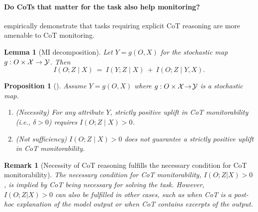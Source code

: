 \documentclass{article}
\theoremstyle{plain}
\newtheorem{proposition}[theorem]{Proposition}
\newtheorem{lemma}[theorem]{Lemma}
\newtheorem{remark}[theorem]{Remark}
\def\indep{\perp\!\!\!\perp}
\begin{document}
\paragraph{Do CoTs that matter for the task also help monitoring?}
\citet{emmons2025chainthoughtnecessarylanguage} empirically demonstrate that tasks requiring explicit CoT reasoning are more amenable to CoT monitoring.

\begin{lemma}[MI decomposition]
\label{lem:decomp}
Let $Y=g(O, X)$ for the stochastic map $g:\mathcal \mathcal O \times \mathcal X \to\mathcal Y$.
Then
\begin{equation}
\label{eq:decomp}
I(O;Z\mid X)
\ =\
I(Y;Z\mid X)\ +\ I(O;Z\mid Y,X).
\end{equation}
\end{lemma}


\begin{proposition}[]
\label{prop:IAZ-necessary-not-sufficient-clean}
Assume $Y=g(O, X)$  where $g:\mathcal \mathcal O \times \mathcal X\!\to\!\mathcal Y$ is a stochastic map.
\begin{enumerate}
\item (Necessity) For any attribute $Y$, strictly positive uplift in CoT monitorability (i.e., $\delta > 0$) requires $I(O;Z\mid X)>0$.
\item (Not sufficiency) $I(O;Z\mid X)>0$ does \emph{not} guarantee a strictly positive uplift in CoT monitorability.
\end{enumerate}
\end{proposition}


\begin{remark}[Necessity of CoT reasoning fulfills the necessary condition for CoT monitorability]
The necessary condition for CoT monitorability, $I(O;Z|X) > 0$, is implied by CoT being necessary for solving the task. However, $I(O;Z|X) > 0$ can also be fulfilled in other cases, such as when CoT is a \emph{post-hoc explanation} of the model output or when CoT contains excerpts of the output.
\end{remark}
\end{document}
